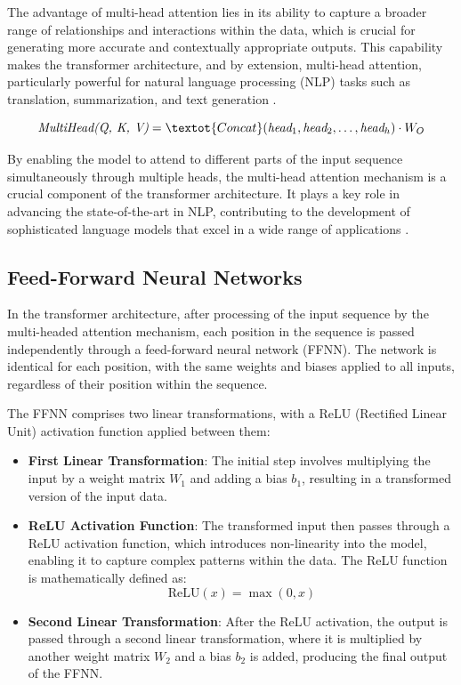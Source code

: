 The advantage of multi-head attention lies in its ability to capture a broader range of relationships and interactions within the data, which is crucial for generating more accurate and contextually appropriate outputs. This capability makes the transformer architecture, and by extension, multi-head attention, particularly powerful for natural language processing (NLP) tasks such as translation, summarization, and text generation \cite{geeksforgeeks2024-sa}.

\begin{equation}
    \textit{MultiHead(Q, K, V)} = \textot{Concat}(\textit{head}_1, \textit{head}_2, \ldots, \textit{head}_h) \cdot W_O
\end{equation}

By enabling the model to attend to different parts of the input sequence simultaneously through multiple heads, the multi-head attention mechanism is a crucial component of the transformer architecture. It plays a key role in advancing the state-of-the-art in NLP, contributing to the development of sophisticated language models that excel in a wide range of applications \cite{vaswani2017attention}.

\subsection{Feed-Forward Neural Networks}

In the transformer architecture, after processing of the input sequence by the multi-headed attention mechanism, each position in the sequence is passed independently through a feed-forward neural network (FFNN). The network is identical for each position, with the same weights and biases applied to all inputs, regardless of their position within the sequence.

The FFNN comprises two linear transformations, with a ReLU (Rectified Linear Unit) activation function applied between them:

\begin{itemize}
    \item \textbf{First Linear Transformation}: The initial step involves multiplying the input by a weight matrix \( W_1 \) and adding a bias \( b_1 \), resulting in a transformed version of the input data.
    \item \textbf{ReLU Activation Function}: The transformed input then passes through a ReLU activation function, which introduces non-linearity into the model, enabling it to capture complex patterns within the data. The ReLU function is mathematically defined as:
    \begin{equation}
        \text{ReLU}(x) = \max(0, x)
    \end{equation}
    \item \textbf{Second Linear Transformation}: After the ReLU activation, the output is passed through a second linear transformation, where it is multiplied by another weight matrix \( W_2 \) and a bias \( b_2 \) is added, producing the final output of the FFNN.
\end{itemize}

